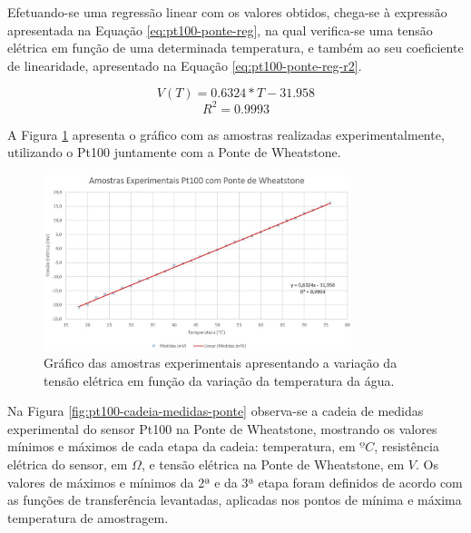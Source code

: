 \documentclass[a4paper]{instrumentacao}
\begin{document}
Efetuando-se uma regressão linear com os valores obtidos, chega-se à expressão apresentada na Equação \ref{eq:pt100-ponte-reg}, na qual verifica-se uma tensão elétrica em função de uma determinada temperatura, e também ao seu coeficiente de linearidade, apresentado na Equação \ref{eq:pt100-ponte-reg-r2}.

\begin{equation}
	V(T) = 0.6324*T - 31.958
	\label{eq:pt100-ponte-reg}
\end{equation}
\begin{equation}
	R^2=0.9993
	\label{eq:pt100-ponte-reg-r2}
\end{equation}

A Figura \ref{fig:pt100-amostras-ponte} apresenta o gráfico com as amostras realizadas experimentalmente, utilizando o Pt100 juntamente com a Ponte de Wheatstone.

\begin{figure}[H]
\center
\includegraphics[width=0.8\textwidth]{grafico_pt100_ponte.jpg}
\caption{Gráfico das amostras experimentais apresentando a variação da tensão elétrica em função da variação da temperatura da água.}
\label{fig:pt100-amostras-ponte}
\end{figure}

Na Figura \ref{fig:pt100-cadeia-medidas-ponte} observa-se a  cadeia de medidas experimental do sensor Pt100 na Ponte de Wheatstone, mostrando os valores mínimos e máximos de cada etapa da cadeia: temperatura, em $ºC$, resistência elétrica do sensor, em $\Omega$, e tensão elétrica na Ponte de Wheatstone, em $V$. Os valores de máximos e mínimos da 2ª e da 3ª etapa foram definidos de acordo com as funções de transferência levantadas, aplicadas nos pontos de mínima e máxima temperatura de amostragem.
\end{document}
